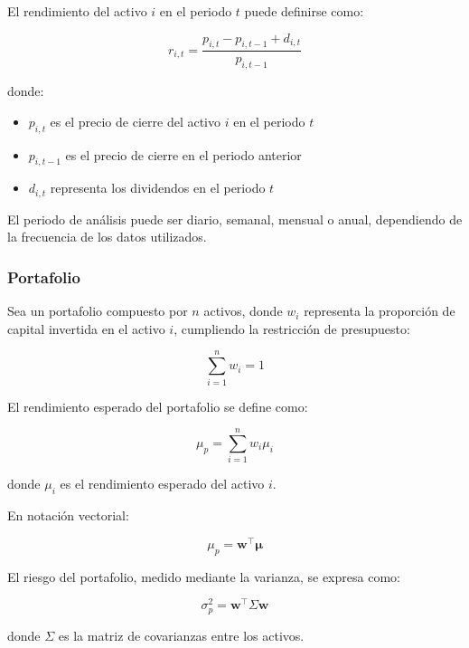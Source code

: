 El rendimiento del activo $i$ en el periodo $t$ puede definirse como:

\begin{equation}
  r_{i,t} = \frac{p_{i,t} - p_{i,t-1} + d_{i,t}}{p_{i,t-1}}
\end{equation}

donde:
\begin{itemize}
  \item $p_{i,t}$ es el precio de cierre del activo $i$ en el periodo $t$
  \item $p_{i,t-1}$ es el precio de cierre en el periodo anterior
  \item $d_{i,t}$ representa los dividendos en el periodo $t$
\end{itemize}

El periodo de análisis puede ser diario, semanal, mensual o anual,
dependiendo de la frecuencia de los datos utilizados.

\subsubsection{Portafolio}

Sea un portafolio compuesto por $n$ activos, donde $w_i$ representa la
proporción de capital invertida en el activo $i$, cumpliendo la
restricción de presupuesto:

\begin{equation}
  \sum_{i=1}^{n} w_i = 1
\end{equation}

El rendimiento esperado del portafolio se define como:

\begin{equation}
  \mu_p = \sum_{i=1}^{n} w_i \mu_i
\end{equation}

donde $\mu_i$ es el rendimiento esperado del activo $i$.

En notación vectorial:

\begin{equation}
  \mu_p = \mathbf{w}^{\top}\boldsymbol{\mu}
\end{equation}

El riesgo del portafolio, medido mediante la varianza, se expresa como:

\begin{equation}
  \sigma_p^2 = \mathbf{w}^{\top}\Sigma\mathbf{w}
\end{equation}

donde $\Sigma$ es la matriz de covarianzas entre los activos.

